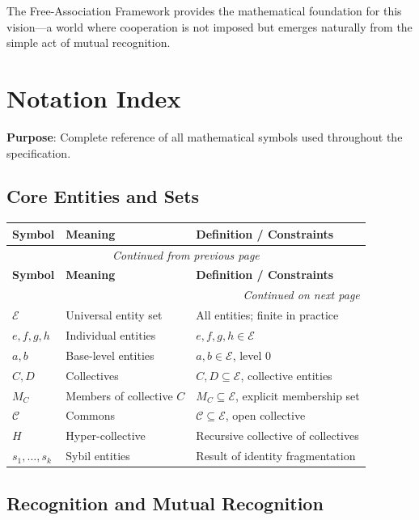 \documentclass[11pt,a4paper]{article}
\theoremstyle{definition}
\theoremstyle{remark}
\newcommand{\E}{\mathcal{E}}
\newcommand{\C}{\mathcal{C}}
\begin{document}
The Free-Association Framework provides the mathematical foundation for this vision---a world where cooperation is not imposed but emerges naturally from the simple act of mutual recognition.

\appendix

\section{Notation Index}

\textbf{Purpose}: Complete reference of all mathematical symbols used throughout the specification.

\subsection{Core Entities and Sets}

\begin{longtable}{lll}
\toprule
\textbf{Symbol} & \textbf{Meaning} & \textbf{Definition / Constraints} \\
\midrule
\endfirsthead
\multicolumn{3}{c}{\textit{Continued from previous page}} \\
\toprule
\textbf{Symbol} & \textbf{Meaning} & \textbf{Definition / Constraints} \\
\midrule
\endhead
\midrule
\multicolumn{3}{r}{\textit{Continued on next page}} \\
\endfoot
\bottomrule
\endlastfoot
$\E$ & Universal entity set & All entities; finite in practice \\
$e, f, g, h$ & Individual entities & $e, f, g, h \in \E$ \\
$a, b$ & Base-level entities & $a, b \in \E$, level 0 \\
$C, D$ & Collectives & $C, D \subseteq \E$, collective entities \\
$M_C$ & Members of collective $C$ & $M_C \subseteq \E$, explicit membership set \\
$\C$ & Commons & $\C \subseteq \E$, open collective \\
$H$ & Hyper-collective & Recursive collective of collectives \\
$s_1, \ldots, s_k$ & Sybil entities & Result of identity fragmentation \\
\end{longtable}

\subsection{Recognition and Mutual Recognition}
\end{document}
